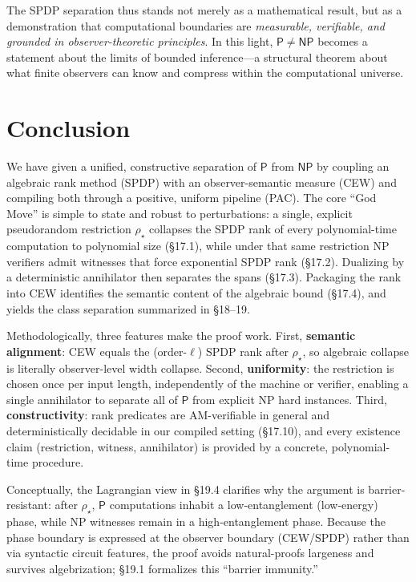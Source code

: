 \documentclass[12pt]{article}
\theoremstyle{definition}
\theoremstyle{definition}
\theoremstyle{remark}
\theoremstyle{remark}
\begin{document}
The SPDP separation thus stands not merely as a mathematical result, but as a demonstration that computational boundaries are \emph{measurable, verifiable, and grounded in observer-theoretic principles}. In this light, $\mathsf{P} \neq \mathsf{NP}$ becomes a statement about the limits of bounded inference---a structural theorem about what finite observers can know and compress within the computational universe.


\section{Conclusion}

We have given a unified, constructive separation of $\mathsf{P}$ from $\mathsf{NP}$ by coupling an algebraic rank method (SPDP) with an observer-semantic measure (CEW) and compiling both through a positive, uniform pipeline (PAC). The core ``God Move'' is simple to state and robust to perturbations: a single, explicit pseudorandom restriction $\rho_\star$ collapses the SPDP rank of every polynomial-time computation to polynomial size (\S17.1), while under that same restriction NP verifiers admit witnesses that force exponential SPDP rank (\S17.2). Dualizing by a deterministic annihilator then separates the spans (\S17.3). Packaging the rank into CEW identifies the semantic content of the algebraic bound (\S17.4), and yields the class separation summarized in \S18--19.

Methodologically, three features make the proof work. First, \textbf{semantic alignment}: CEW equals the (order-$\ell$) SPDP rank after $\rho_\star$, so algebraic collapse is literally observer-level width collapse. Second, \textbf{uniformity}: the restriction is chosen once per input length, independently of the machine or verifier, enabling a single annihilator to separate all of $\mathsf{P}$ from explicit NP hard instances. Third, \textbf{constructivity}: rank predicates are AM-verifiable in general and deterministically decidable in our compiled setting (\S17.10), and every existence claim (restriction, witness, annihilator) is provided by a concrete, polynomial-time procedure.

Conceptually, the Lagrangian view in \S19.4 clarifies why the argument is barrier-resistant: after $\rho_\star$, $\mathsf{P}$ computations inhabit a low-entanglement (low-energy) phase, while NP witnesses remain in a high-entanglement phase. Because the phase boundary is expressed at the observer boundary (CEW/SPDP) rather than via syntactic circuit features, the proof avoids natural-proofs largeness and survives algebrization; \S19.1 formalizes this ``barrier immunity.''
\end{document}
